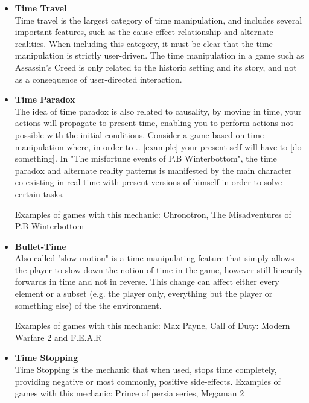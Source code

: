 \begin{itemize}
\item{\textbf{Time Travel}} \\ 

Time travel is the largest category of time manipulation, and includes several important features, 
such as the cause-effect relationship and alternate realities. When including this category, it must be clear that the 
time manipulation is strictly user-driven. The time manipulation in a game such as Assassin's Creed is only related to the historic setting and its story, and not as a consequence of user-directed interaction. 

\item{\textbf{Time Paradox}} \\ 

The idea of time paradox is also related to causality, by moving in time, 
your actions will propagate to present time, enabling you to perform actions not possible with the initial conditions. 
Consider a game based on time manipulation where, in order to .. [example] 
your present self will have to [do something]. In "The misfortune events of P.B Winterbottom", the time paradox and alternate reality 
patterns is manifested by the main character co-existing in real-time with present versions of himself in order to solve certain tasks.

Examples of games with this mechanic: Chronotron, The Misadventures of P.B Winterbottom

\item{\textbf{Bullet-Time}} \\ 

Also called "slow motion" is a time manipulating feature that simply allows the player to slow 
down the notion of time in the game, however still linearily forwards in time and not in reverse. 
This change can affect either every element or a subset (e.g. the player only, everything but the player or something else) of the the environment. 

Examples of games with this mechanic: Max Payne, Call of Duty: Modern Warfare 2 and F.E.A.R

\item{\textbf{Time Stopping}} \\ 

Time Stopping is the mechanic that when used, stops time completely, providing negative or most commonly, positive side-effects. 
Examples of games with this mechanic: Prince of persia series, Megaman 2
\end{itemize}

